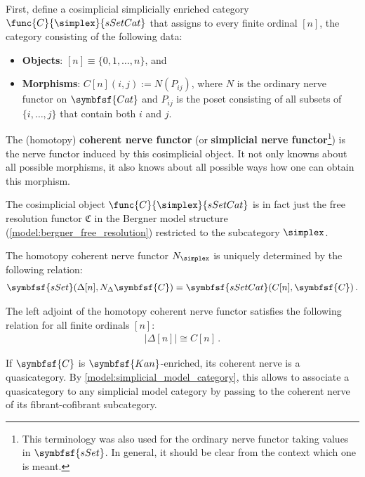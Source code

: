    First, define a cosimplicial simplicially enriched category $\func{C}{\simplex}{sSetCat}$ that assigns to every finite ordinal $[n]$, the category consisting of the following data:
    \begin{itemize}
        \item\textbf{Objects}: $[n]\equiv\{0,1,\ldots,n\}$, and
        \item\textbf{Morphisms}: $C[n](i,j) := N(P_{ij})$, where $N$ is the ordinary nerve functor on $\symbfsf{Cat}$ and $P_{ij}$ is the poset consisting of all subsets of $\{i,\ldots,j\}$ that contain both $i$ and $j$.
    \end{itemize}
    The (homotopy) \textbf{coherent nerve functor} (or \textbf{simplicial nerve functor}\footnote{This terminology was also used for the ordinary nerve functor taking values in $\symbfsf{sSet}$. In general, it should be clear from the context which one is meant.}) is the nerve functor induced by this cosimplicial object. It not only knowns about all possible morphisms, it also knows about all possible ways how one can obtain this morphism.
    \begin{remark}
        The cosimplicial object $\func{C}{\simplex}{sSetCat}$ is in fact just the free resolution functor $\mathfrak{C}$ in the Bergner model structure (\cref{model:bergner_free_resolution}) restricted to the subcategory $\simplex$.
    \end{remark}

    \begin{property}
        The homotopy coherent nerve functor $N_{\simplex}$ is uniquely determined by the following relation:
        \begin{gather}
            \symbfsf{sSet}(\Delta[n],N_\Delta\symbfsf{C})=\symbfsf{sSetCat}(C[n],\symbfsf{C})\,.
        \end{gather}
    \end{property}

    \begin{property}
        The left adjoint of the homotopy coherent nerve functor satisfies the following relation for all finite ordinals $[n]$:
        \begin{gather}
            |\Delta[n]|\cong C[n]\,.
        \end{gather}
    \end{property}

    \begin{property}[Quasicategories]
        If $\symbfsf{C}$ is $\symbfsf{Kan}$-enriched, its coherent nerve is a quasicategory. By \cref{model:simplicial_model_category}, this allows to associate a quasicategory to any simplicial model category by passing to the coherent nerve of its fibrant-cofibrant subcategory.
    \end{property}

